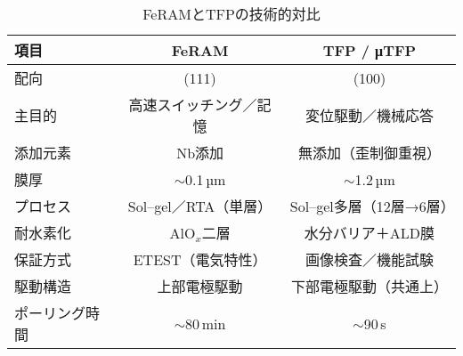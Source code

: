 \documentclass[conference]{IEEEtran}
\begin{document}
\begin{table}[!t]
\centering
\caption{FeRAMとTFPの技術的対比}
\label{tab:compare}
\begin{tabular}{lcc}
\toprule
項目 & FeRAM & TFP / μTFP \\
\midrule
配向 & (111) & (100) \\
主目的 & 高速スイッチング／記憶 & 変位駆動／機械応答 \\
添加元素 & Nb添加 & 無添加（歪制御重視） \\
膜厚 & $\sim$0.1\,µm & $\sim$1.2\,µm \\
プロセス & Sol--gel／RTA（単層） & Sol--gel多層（12層→6層） \\
耐水素化 & AlO$_x$二層 & 水分バリア＋ALD膜 \\
保証方式 & ETEST（電気特性） & 画像検査／機能試験 \\
駆動構造 & 上部電極駆動 & 下部電極駆動（共通上） \\
ポーリング時間 & $\sim$80\,min & $\sim$90\,s \\
\bottomrule
\end{tabular}
\end{table}
\end{document}
